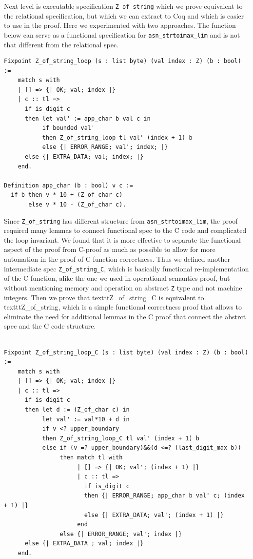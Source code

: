 \documentclass[acmsmall,nonacm]{acmart}
\begin{document}
Next level is executable specification \texttt{Z\_of\_string} which we prove equivalent to the relational specification, but which we can extract to Coq and which is easier to use in the proof. Here we experimented with two approaches. The function below can serve as a functional specification for \texttt{asn\_strtoimax\_lim} and is not that different from the relational spec.

 \begin{lstlisting}[language=Coq]
Fixpoint Z_of_string_loop (s : list byte) (val index : Z) (b : bool) := 
    match s with 
    | [] => {| OK; val; index |}
    | c :: tl => 
      if is_digit c
      then let val' := app_char b val c in 
           if bounded val'
           then Z_of_string_loop tl val' (index + 1) b
           else {| ERROR_RANGE; val'; index; |}      
      else {| EXTRA_DATA; val; index; |}              
    end.

Definition app_char (b : bool) v c := 
  if b then v * 10 + (Z_of_char c) 
       else v * 10 - (Z_of_char c).
 \end{lstlisting}

Since \texttt{Z\_of\_string} has different structure from \texttt{asn\_strtoimax\_lim}, the proof required many lemmas to connect functional spec to the C code and complicated the loop invariant. We found that it is more effective to separate the functional aspect of the proof from C-proof as much as possible to allow for more automation in the proof of C function correctness. Thus we defined another intermediate spec \texttt{Z\_of\_string\_C}, which is basically functional re-implementation of the C function, alike the one we used in operational semantics proof, but without mentioning memory and operation on abstract \texttt{Z} type and not machine integers. Then we prove that texttt{Z\_of\_string\_C} is equivalent to texttt{Z\_of\_string}, which is a simple functional correctness proof that allows to eliminate the need for additional lemmas in the C proof that connect the abstrct spec and the C code structure.

 \begin{lstlisting}[language=Coq]
 
Fixpoint Z_of_string_loop_C (s : list byte) (val index : Z) (b : bool) := 
    match s with 
    | [] => {| OK; val; index |}
    | c :: tl => 
      if is_digit c
      then let d := (Z_of_char c) in 
           let val' := val*10 + d in
           if v <? upper_boundary 
           then Z_of_string_loop_C tl val' (index + 1) b
           else if (v =? upper_boundary)&&(d <=? (last_digit_max b))
                then match tl with
                     | [] => {| OK; val'; (index + 1) |}
                     | c :: tl => 
                       if is_digit c
                       then {| ERROR_RANGE; app_char b val' c; (index + 1) |}
                       else {| EXTRA_DATA; val'; (index + 1) |}
                     end
                else {| ERROR_RANGE; val'; index |}      
      else {| EXTRA_DATA ; val; index |}              
    end.
    
 \end{lstlisting}
\end{document}
